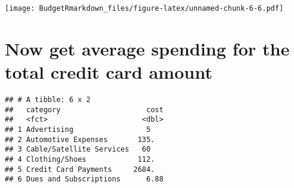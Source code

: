 \documentclass[
]{article}
\newenvironment{Shaded}{\begin{snugshade}}{\end{snugshade}}
\newcommand{\CommentTok}[1]{\textcolor[rgb]{0.56,0.35,0.01}{\textit{#1}}}
\newcommand{\DataTypeTok}[1]{\textcolor[rgb]{0.13,0.29,0.53}{#1}}
\newcommand{\DecValTok}[1]{\textcolor[rgb]{0.00,0.00,0.81}{#1}}
\newcommand{\KeywordTok}[1]{\textcolor[rgb]{0.13,0.29,0.53}{\textbf{#1}}}
\newcommand{\NormalTok}[1]{#1}
\newcommand{\OperatorTok}[1]{\textcolor[rgb]{0.81,0.36,0.00}{\textbf{#1}}}
\newcommand{\StringTok}[1]{\textcolor[rgb]{0.31,0.60,0.02}{#1}}
\begin{document}
\texttt{[image: BudgetRmarkdown\_files/figure-latex/unnamed-chunk-6-6.pdf]}

\hypertarget{now-get-average-spending-for-the-total-credit-card-amount}{%
\section{Now get average spending for the total credit card
amount}\label{now-get-average-spending-for-the-total-credit-card-amount}}

\begin{Shaded}
\end{Shaded}

\begin{verbatim}
## # A tibble: 6 x 2
##   category                    cost
##   <fct>                      <dbl>
## 1 Advertising                 5   
## 2 Automotive Expenses       135.  
## 3 Cable/Satellite Services   60   
## 4 Clothing/Shoes            112.  
## 5 Credit Card Payments     2684.  
## 6 Dues and Subscriptions      6.88
\end{verbatim}
\end{document}
